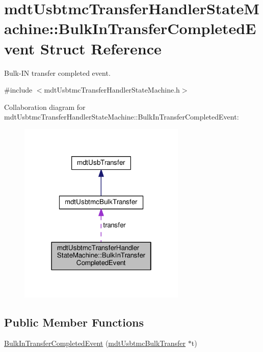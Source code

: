\hypertarget{structmdt_usbtmc_transfer_handler_state_machine_1_1_bulk_in_transfer_completed_event}{\section{mdt\-Usbtmc\-Transfer\-Handler\-State\-Machine\-:\-:Bulk\-In\-Transfer\-Completed\-Event Struct Reference}
\label{structmdt_usbtmc_transfer_handler_state_machine_1_1_bulk_in_transfer_completed_event}
}


Bulk-\/\-I\-N transfer completed event.  




{\ttfamily \#include $<$mdt\-Usbtmc\-Transfer\-Handler\-State\-Machine.\-h$>$}



Collaboration diagram for mdt\-Usbtmc\-Transfer\-Handler\-State\-Machine\-:\-:Bulk\-In\-Transfer\-Completed\-Event\-:\nopagebreak
\begin{figure}[H]
\begin{center}
\leavevmode
\includegraphics[width=226pt]{structmdt_usbtmc_transfer_handler_state_machine_1_1_bulk_in_transfer_completed_event__coll__graph}
\end{center}
\end{figure}
\subsection*{Public Member Functions}
\begin{DoxyCompactItemize}
\item 
\hyperlink{structmdt_usbtmc_transfer_handler_state_machine_1_1_bulk_in_transfer_completed_event_aaf84232c57add6fb63bc4946d4867387}{Bulk\-In\-Transfer\-Completed\-Event} (\hyperlink{classmdt_usbtmc_bulk_transfer}{mdt\-Usbtmc\-Bulk\-Transfer} $\ast$t)
\end{DoxyCompactItemize}
